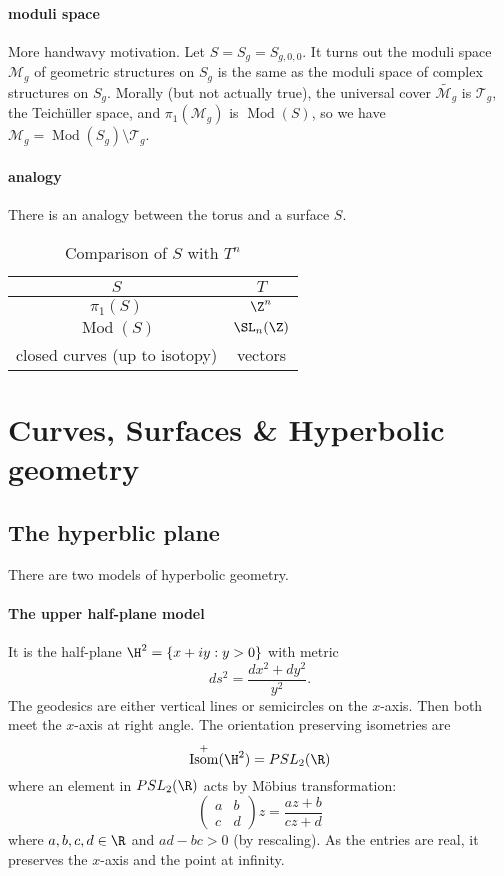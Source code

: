 \documentclass[a4paper]{article}
\DeclareMathOperator{\Mod}{Mod}
\DeclareMathOperator{\Isom}{Isom}
\begin{document}
\paragraph{moduli space}

More handwavy motivation. Let \(S = S_g = S_{g, 0, 0}\). It turns out the moduli space \(\mathcal M_g\) of geometric structures on \(S_g\) is the same as the moduli space of complex structures on \(S_g\). Morally (but not actually true), the universal cover \(\tilde{\mathcal M_g}\) is \(\mathcal T_g\), the Teichüller space, and \(\pi_1(\mathcal M_g)\) is \(\Mod(S)\), so we have \(\mathcal M_g = \Mod(S_g) \setminus \mathcal T_g\).

\paragraph{analogy}

There is an analogy between the torus and a surface \(S\).

\begin{table}[h!]
  \centering
  \begin{tabular}{c|c}
    \(S\) & \(T\) \\ \hline
    \(\pi_1(S)\) & \(\Z^n\) \\ \hline
    \(\Mod(S)\) & \(\SL_n(\Z)\) \\ \hline
    closed curves (up to isotopy) & vectors
  \end{tabular}
  \caption{Comparison of \(S\) with \(T^n\)}
\end{table}

\section{Curves, Surfaces \& Hyperbolic geometry}

\subsection{The hyperblic plane}

There are two models of hyperbolic geometry.

\paragraph{The upper half-plane model}

It is the half-plane \(\H^2 = \{x + iy: y > 0\}\) with metric
\[
  ds^2 = \frac{dx^2 + dy^2}{y^2}.
\]
The geodesics are either vertical lines or semicircles on the \(x\)-axis. Then both meet the \(x\)-axis at right angle. The orientation preserving isometries are
\[
  \Isom^+(\H^2) = PSL_2(\R)
\]
where an element in \(PSL_2(\R)\) acts by Möbius transformation:
\[
  \begin{pmatrix}
    a & b \\
    c & d
  \end{pmatrix}
  z = \frac{az + b}{cz + d}
\]
where \(a, b, c, d \in \R\) and \(ad - bc > 0\) (by rescaling). As the entries are real, it preserves the \(x\)-axis and the point at infinity.
\end{document}
